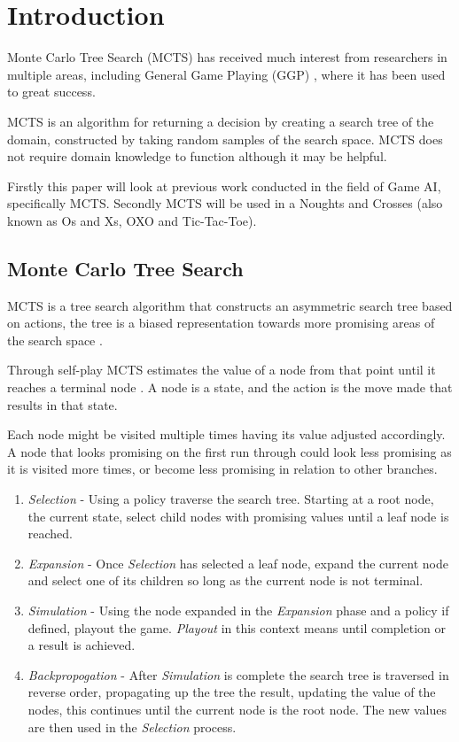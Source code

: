 \section{Introduction}
Monte Carlo Tree Search (MCTS) has received much interest from researchers in multiple areas, including General Game Playing (GGP) \cite{b1},  where it has been used to great success.

MCTS is an algorithm for returning a decision by creating a search tree of the domain, constructed by taking random samples of the search space. MCTS does not require domain knowledge to function although it may be helpful\cite{b2}.

Firstly this paper will look at previous work conducted in the field of Game AI, specifically MCTS. Secondly MCTS will be used in a Noughts and Crosses (also known as Os and Xs, OXO and Tic-Tac-Toe).

\subsection{Monte Carlo Tree Search}
MCTS is a tree search algorithm that constructs an asymmetric search tree based on actions, the tree is a biased representation towards more promising areas of the search space \cite{b3}.

Through self-play MCTS estimates the value of a node from that point until it reaches a terminal node \cite{b3}. A node is a state, and the action is the move made that results in that state.  

Each node might be visited multiple times having its value adjusted accordingly. A node that looks promising on the first run through could look less promising as it is visited more times, or become less promising in relation to other branches. 

\begin{enumerate}
  \item {\em Selection} - Using a policy traverse the search tree. Starting at a root node, the current state, select child nodes with promising values until a leaf node is reached.
  \item {\em Expansion} - Once {\em Selection} has selected a leaf node, expand the current node and select one of its children so long as the current node is not terminal.   
  \item {\em Simulation} - Using the node expanded in the {\em Expansion} phase and a policy if defined, playout the game. {\em Playout} in this context means until completion or a result is achieved.
  \item {\em Backpropogation} - After {\em Simulation} is complete the search tree is traversed in reverse order, propagating up the tree the result, updating the value of the nodes, this continues until the current node is the root node. The new values are then used in the {\em Selection} process.
\end{enumerate}

